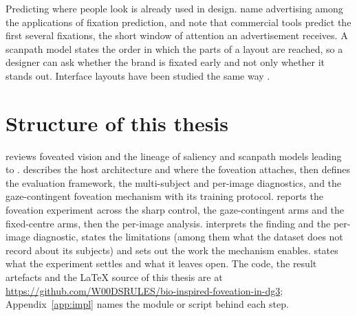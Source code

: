 Predicting where people look is already used in design. \citet{judd2009mit1003} name advertising among
the applications of fixation prediction, and \citet{wloka2018starfc} note that commercial tools predict
the first several fixations, the short window of attention an advertisement receives. A scanpath model
states the order in which the parts of a layout are reached, so a designer can ask whether the brand is
fixated early and not only whether it stands out. Interface layouts have been studied the same way
\citep{jiang2024eyeformer}.

\section{Structure of this thesis}

 reviews foveated vision and the lineage of saliency and scanpath models leading to
\dg{}.  describes the host architecture and where the foveation attaches, then defines the
evaluation framework, the multi-subject and per-image diagnostics, and the gaze-contingent foveation
mechanism with its training protocol.  reports the foveation experiment across the sharp
control, the gaze-contingent arms and the fixed-centre arms, then the per-image
analysis.  interprets the finding and the per-image diagnostic, states the
limitations (among them what the dataset does not record about its subjects) and sets out the work the
mechanism enables.  states what the experiment settles and what it leaves open.
The code, the result artefacts and the LaTeX source of this thesis are at
\url{https://github.com/W00DSRULES/bio-inspired-foveation-in-dg3}; Appendix~\ref{app:impl} names the module or
script behind each step.
